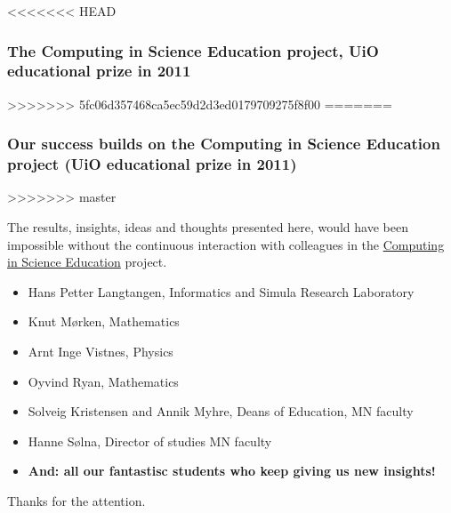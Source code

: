 \documentclass{beamer}
\begin{document}
\begin{frame}
<<<<<<< HEAD
\frametitle{The Computing in Science Education project, UiO educational prize in 2011}
>>>>>>> 5fc06d357468ca5ec59d2d3ed0179709275f8f00
=======
\frametitle{Our success builds on the Computing in Science Education project (UiO educational prize in 2011)}
>>>>>>> master

\begin{block}{}
The results, insights, ideas and thoughts presented here, would have been impossible without the continuous interaction with colleagues in the \href{{http://www.mn.uio.no/english/about/collaboration/cse/}}{Computing in Science Education} project.

\begin{itemize}
\item Hans Petter Langtangen, Informatics and Simula Research Laboratory

\item Knut Mørken, Mathematics

\item Arnt Inge Vistnes, Physics

\item Oyvind Ryan, Mathematics

\item Solveig Kristensen and Annik Myhre, Deans of Education, MN faculty

\item Hanne Sølna, Director of studies MN faculty

\item \textbf{And: all our fantastisc students who keep giving us new insights!}
\end{itemize}

\noindent
\end{block}
Thanks for the attention.
\end{frame}
\end{document}
